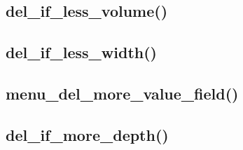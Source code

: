 \documentclass[12pt, a4paper]{article}
\begin{document}

\subsection{del\_if\_less\_volume()}






\subsection{del\_if\_less\_width()}






\subsection{menu\_del\_more\_value\_field()}






\subsection{del\_if\_more\_depth()}




\end{document}
